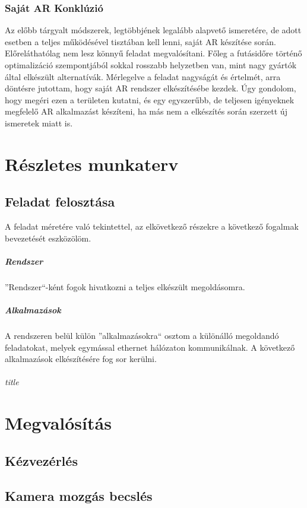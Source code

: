 \documentclass[12pt,a4paper,oneside]{report} %
\begin{document}
\subsection{Saját AR Konklúzió}
Az előbb tárgyalt módszerek, legtöbbjének legalább alapvető ismeretére, de adott esetben a teljes  működésével tisztában kell lenni, saját AR készítése során. Előreláthatólag nem lesz könnyű feladat megvalósítani. Főleg a futásidőre történő optimalizáció szempontjából sokkal rosszabb helyzetben van, mint nagy gyártók által elkészült alternatívák. Mérlegelve a feladat nagyságát és értelmét, arra döntésre jutottam, hogy saját AR rendszer elkészítésébe kezdek. Úgy gondolom, hogy megéri ezen a területen kutatni, és egy egyszerűbb, de teljesen igényeknek megfelelő AR alkalmazást készíteni, ha más nem a elkészítés során szerzett új ismeretek miatt is.

\chapter{Részletes munkaterv}
\label{munakterv}
\section{Feladat felosztása}
A feladat méretére való tekintettel, az elkövetkező részekre a következő fogalmak bevezetését eszközölöm.
\paragraph{Rendszer}
''Rendszer``-ként fogok hivatkozni a teljes elkészült megoldásomra.
\paragraph{Alkalmazások}
A rendszeren belül külön ''alkalmazásokra`` osztom a különálló megoldandó feladatokat, melyek egymással ethernet hálózaton kommunikálnak.
A következő alkalmazások elkészítésére fog sor kerülni.
\subparagraph{title}


\begin{figure}[H]
\end{figure}
\chapter{Megvalósítás}
\section{Kézvezérlés}
\label{kezvez}
\section{Kamera mozgás becslés}
\end{document}
